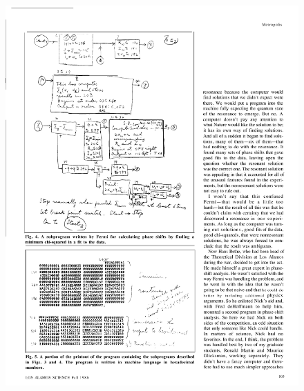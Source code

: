 \documentclass[hyperref={colorlinks=true}]{beamer}
\begin{document}
\begin{frame}[shrink=20]
\begin{columns}
    
      \begin{figure}
        \centering
        \includegraphics[width=0.8\columnwidth]{FermiPhaseShiftComputation.pdf}
      \end{figure}
  
  \end{columns}
  
\end{frame}



\end{document}
